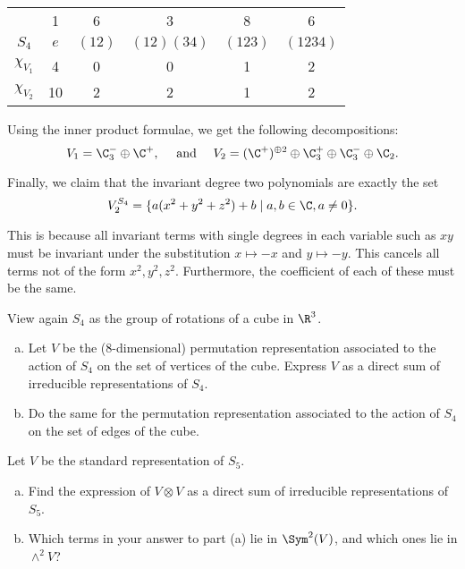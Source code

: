 \documentclass[11pt,letterpaper]{article}
\begin{document}
\begin{center}
\begin{tabular}{ c|ccccc } 
    & 1 & 6 & 3 & 8 & 6\\
    $S_4$ & $e$ & $(12)$ & $(12)(34)$ & $(123)$ & $(1234)$ \\
\hline
    $\chi_{V_1}$ & 4 & 0 & 0 & 1 & 2\\
    $\chi_{V_2}$ & 10 & 2 & 2 & 1 & 2
\end{tabular}
\end{center}

Using the inner product formulae, we get the following decompositions:
\[
    V_1 = \C^-_3\oplus \C^+,\quad\textrm{ and }\quad V_2=(\C^+)^{\oplus 2} \oplus \C_3^+\oplus \C_3^-\oplus \C_2
.\] 

Finally, we claim that the invariant degree two polynomials are exactly the set
\[
    V_2^{S_4}=\{a(x^2+y^2+z^2)+b \mid a,b\in \C, a\neq 0\}
.\] 

This is because all invariant terms with single degrees in each variable such as $xy$ must be invariant under the substitution $x\mapsto -x$ and $y\mapsto -y$. This cancels all terms not of the form $x^2,y^2,z^2$. Furthermore, the coefficient of each of these must be the same.

\pagebreak
\begin{problem}
    View again $S_4$ as the group of rotations of a cube in $\R^3$.
    \begin{enumerate}[(a)]
       \item Let $V$ be the (8-dimensional) permutation representation associated to the action of $S_4$ on the set of vertices of the cube. Express $V$ as a direct sum of irreducible representations of $S_4$.
       \item Do the same for the permutation representation associated to the action of $S_4$ on the set of edges of the cube.
    \end{enumerate}
\end{problem}

\pagebreak
\begin{problem}
    Let $V$ be the standard representation of $S_5$.
    \begin{enumerate}[(a)]
        \item Find the expression of $V\otimes V$ as a direct sum of irreducible representations of $S_5$.
        \item Which terms in your answer to part (a) lie in $\Sym^2(V)$, and which ones lie in $\wedge^2 V$?
    \end{enumerate}
\end{problem}
\end{document}
